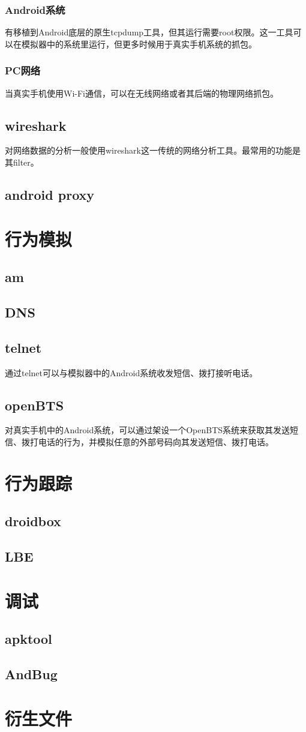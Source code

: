 \subsubsection{Android系统}
有移植到Android底层的原生tcpdump工具，但其运行需要root权限。这一工具可以在模拟器中的系统里运行，但更多时候用于真实手机系统的抓包。
\subsubsection{PC网络}
当真实手机使用Wi-Fi通信，可以在无线网络或者其后端的物理网络抓包。
\subsection{wireshark}
对网络数据的分析一般使用wireshark这一传统的网络分析工具。最常用的功能是其filter。

\subsection{android proxy}
\section{行为模拟}
\subsection{am}

\subsection{DNS}

\subsection{telnet}
通过telnet可以与模拟器中的Android系统收发短信、拨打接听电话。
\subsection{openBTS}
对真实手机中的Android系统，可以通过架设一个OpenBTS系统来获取其发送短信、拨打电话的行为，并模拟任意的外部号码向其发送短信、拨打电话。

\section{行为跟踪}
\subsection{droidbox}
\subsection{LBE}

\section{调试}
\label{Sec:debug}
\subsection{apktool}
\subsection{AndBug}

\section{衍生文件}
